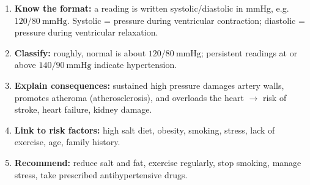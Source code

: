 \documentclass[11pt]{article}
\newcommand{\cle}[1]{{\popxbold\color{popdark}#1}}
\begin{document}
\begin{methode}
\begin{enumerate}
\item \textbf{Know the format:} a reading is written systolic/diastolic in mmHg, e.g. $120/80\ \mathrm{mmHg}$. Systolic = pressure during ventricular contraction; diastolic = pressure during ventricular relaxation.
\item \textbf{Classify:} roughly, normal is about $120/80\ \mathrm{mmHg}$; persistent readings at or above $140/90\ \mathrm{mmHg}$ indicate \cle{hypertension}.
\item \textbf{Explain consequences:} sustained high pressure damages artery walls, promotes atheroma (atherosclerosis), and overloads the heart $\rightarrow$ risk of stroke, heart failure, kidney damage.
\item \textbf{Link to risk factors:} high salt diet, obesity, smoking, stress, lack of exercise, age, family history.
\item \textbf{Recommend:} reduce salt and fat, exercise regularly, stop smoking, manage stress, take prescribed antihypertensive drugs.
\end{enumerate}
\end{methode}
\end{document}
